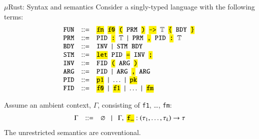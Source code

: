 \documentclass{beamer}
\newcommand{\codett}[1]{\texttt{\hl{#1}}}
\newcommand{\nt}[1]{\texttt{#1}}      %
\newcommand{\tok}[1]{\codett{#1}}     %
\newcommand{\gap}{\;\;}
\begin{document}
\begin{frame}{$\mu$Rust: Syntax and semantics}
  Consider a singly-typed language with the following terms:
  \[
    \hspace{-0.1cm}\begin{array}{ccl}
     \nt{FUN} & ::= & \tok{fn}\gap \tok{f0}\gap \tok{(}\gap \nt{PRM}\gap \tok{)}\gap \tok{->}\gap \mathbb{T} \gap \tok{\{}\gap \nt{BDY} \gap \tok{\}}\\
     \nt{PRM} & ::= & \nt{PID}\gap \tok{:}\gap \mathbb{T} \;\mid\; \nt{PRM}\gap \tok{,}\gap \nt{PID}\gap \tok{:}\gap \mathbb{T} \\
     \nt{BDY} & ::= & \nt{INV}\;\mid\; \nt{STM} \gap \nt{BDY}\\
     \nt{STM} & ::= & \codett{let}\gap\nt{PID}\gap \codett{=}\gap \nt{INV}\gap\codett{;}\\
     \nt{INV} & ::= & \nt{FID}\gap \tok{(}\gap \nt{ARG}\gap \tok{)} \\
     \nt{ARG} & ::= & \nt{PID} \;\mid\; \nt{ARG}\gap \tok{,}\gap \nt{ARG} \\
     \nt{PID} & ::= & \tok{p1} \;\mid\; \ldots \;\mid\; \tok{pk} \\
     \nt{FID} & ::= & \tok{f0} \;\mid\; \tok{f1} \;\mid\; \ldots \;\mid\; \tok{fm}\\
    \end{array}
  \]

  \noindent Assume an ambient context, $\Gamma$, consisting of \texttt{f1}, \ldots, \texttt{fm}:
  \[
    \begin{array}{rcl}
      \Gamma & ::= & \varnothing \texttt{ }\mid \texttt{ }\Gamma,\;\codett{f\_} : (\tau_{1}, \ldots, \tau_{k}) \rightarrow \tau
    \end{array}
  \]
  The unrestricted semantics are conventional.
\end{frame}
\end{document}
